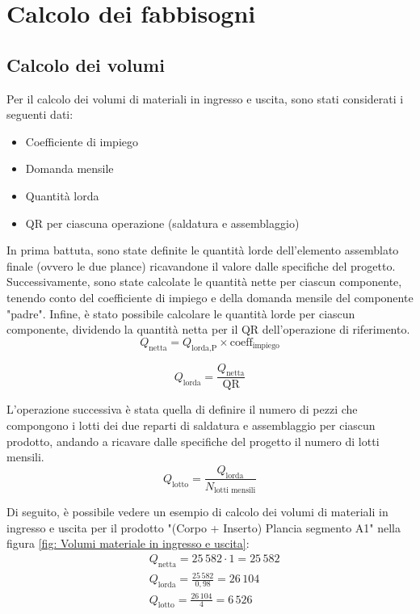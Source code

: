 \documentclass[11pt]{article}
\begin{document}
\section{Calcolo dei fabbisogni}
\subsection{Calcolo dei volumi}
Per il calcolo dei volumi di materiali in ingresso e uscita, sono stati considerati i seguenti dati:
\begin{itemize}
    \item Coefficiente di impiego
    \item Domanda mensile
    \item Quantità lorda
    \item QR per ciascuna operazione (saldatura e assemblaggio)
\end{itemize}

In prima battuta, sono state definite le quantità lorde dell'elemento assemblato finale (ovvero le due plance) ricavandone il valore dalle specifiche del progetto. Successivamente, sono state calcolate le quantità nette per ciascun componente, tenendo conto del coefficiente di impiego e della domanda mensile del componente "padre". Infine, è stato possibile calcolare le quantità lorde per ciascun componente, dividendo la quantità netta per il QR dell'operazione di riferimento.
\begin{equation}
    Q_\text{netta} = Q_\text{lorda,P} \times \text{coeff}_\text{impiego}
\end{equation}

\begin{equation}
    Q_\text{lorda} = \frac{Q_\text{netta}}{\text{QR}}
\end{equation}

L'operazione successiva è stata quella di definire il numero di pezzi che compongono i lotti dei due reparti di saldatura e assemblaggio per ciascun prodotto, andando a ricavare dalle specifiche del progetto il numero di lotti mensili.
\begin{equation}
    Q_\text{lotto} = \frac{Q_\text{lorda}}{N_\text{lotti mensili}}
\end{equation}

Di seguito, è possibile vedere un esempio di calcolo dei volumi di materiali in ingresso e uscita per il prodotto "(Corpo + Inserto) Plancia segmento A1" nella figura \ref{fig: Volumi materiale in ingresso e uscita}:
\begin{align*}
    & Q_\text{netta} = 25\,582 \cdot 1 = 25\,582 \\
    & Q_\text{lorda} = \frac{25\,582}{0,98} = 26\,104 \\
    & Q_\text{lotto} = \frac{26\,104}{4} = 6\,526
\end{align*}
\end{document}
